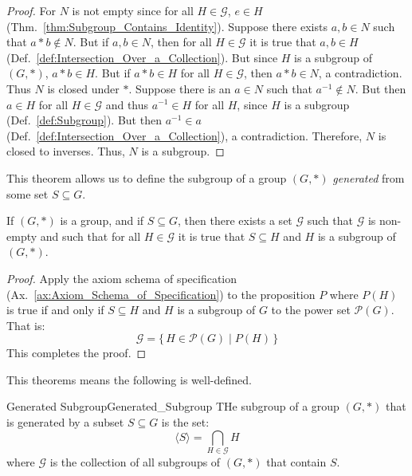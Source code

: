         \begin{proof}
            For $N$ is not empty since for all $H\in\mathcal{G}$, $e\in{H}$
            (Thm.~\ref{thm:Subgroup_Contains_Identity}). Suppose there exists
            $a,b\in{N}$ such that $a*b\notin{N}$. But if $a,b\in{N}$, then for
            all $H\in\mathcal{G}$ it is true that $a,b\in{H}$
            (Def.~\ref{def:Intersection_Over_a_Collection}). But since $H$ is a
            subgroup of $(G,*)$, $a*b\in{H}$. But if $a*b\in{H}$ for all
            $H\in\mathcal{G}$, then $a*b\in{N}$, a contradiction. Thus $N$ is
            closed under $*$. Suppose there is an $a\in{N}$ such that
            $a^{\minus{1}}\notin{N}$. But then $a\in{H}$ for all
            $H\in\mathcal{G}$ and thus $a^{\minus{1}}\in{H}$ for all $H$, since
            $H$ is a subgroup (Def.~\ref{def:Subgroup}). But then
            $a^{\minus{1}}\in{a}$
            (Def.~\ref{def:Intersection_Over_a_Collection}), a contradiction.
            Therefore, $N$ is closed to inverses. Thus, $N$ is a subgroup.
        \end{proof}
        This theorem allows us to define the subgroup of a group $(G,*)$
        \textit{generated} from some set $S\subseteq{G}$.
        \begin{theorem}
            If $(G,*)$ is a group, and if $S\subseteq{G}$, then there exists a
            set $\mathcal{G}$ such that $\mathcal{G}$ is non-empty and such that
            for all $H\in\mathcal{G}$ it is true that $S\subseteq{H}$ and $H$ is
            a subgroup of $(G,*)$.
        \end{theorem}
        \begin{proof}
            Apply the axiom schema of specification
            (Ax.~\ref{ax:Axiom_Schema_of_Specification}) to the proposition
            $P$ where $P(H)$ is true if and only if $S\subseteq{H}$ and $H$ is
            a subgroup of $G$ to the power set $\mathcal{P}(G)$. That is:
            \begin{equation}
                \mathcal{G}=\big\{\,H\in\mathcal{P}(G)\;|\;P(H)\,\big\}
            \end{equation}
            This completes the proof.
        \end{proof}
        This theorems means the following is well-defined.
        \begin{fdefinition}{Generated Subgroup}{Generated_Subgroup}
            THe subgroup of a group $(G,*)$ that is generated by a subset
            $S\subseteq{G}$ is the set:
            \begin{equation}
                \langle{S}\rangle=\bigcap_{H\in\mathcal{G}}H
            \end{equation}
            where $\mathcal{G}$ is the collection of all subgroups of $(G,*)$
            that contain $S$.
        \end{fdefinition}
